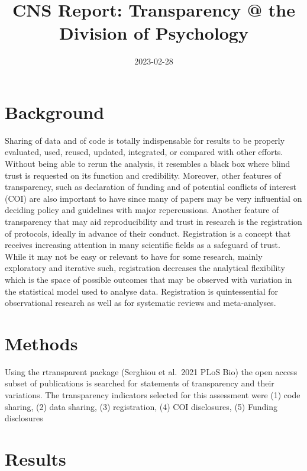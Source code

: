 \documentclass[
]{article}
\title{CNS Report: Transparency @ the Division of Psychology}
\author{}
\date{\vspace{-2.5em}2023-02-28}
\begin{document}
\maketitle

\hypertarget{background}{%
\section{Background}\label{background}}

Sharing of data and of code is totally indispensable for results to be
properly evaluated, used, reused, updated, integrated, or compared with
other efforts. Without being able to rerun the analysis, it resembles a
black box where blind trust is requested on its function and
credibility. Moreover, other features of transparency, such as
declaration of funding and of potential conflicts of interest (COI) are
also important to have since many of papers may be very influential on
deciding policy and guidelines with major repercussions. Another feature
of transparency that may aid reproducibility and trust in research is
the registration of protocols, ideally in advance of their conduct.
Registration is a concept that receives increasing attention in many
scientific fields as a safeguard of trust. While it may not be easy or
relevant to have for some research, mainly exploratory and iterative
such, registration decreases the analytical flexibility which is the
space of possible outcomes that may be observed with variation in the
statistical model used to analyse data. Registration is quintessential
for observational research as well as for systematic reviews and
meta-analyses.

\hypertarget{methods}{%
\section{Methods}\label{methods}}

Using the rtransparent package (Serghiou et al.~2021 PLoS Bio) the open
access subset of publications is searched for statements of transparency
and their variations. The transparency indicators selected for this
assessment were (1) code sharing, (2) data sharing, (3) registration,
(4) COI disclosures, (5) Funding disclosures

\hypertarget{results}{%
\section{Results}\label{results}}
\end{document}
